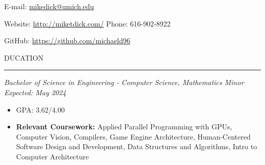 \documentclass[11pt]{article}
\begin{document}
 \hfill E-mail: {\color{black}\url{ mikedick@umich.edu}}
\par Website: \url{http://miketdick.com/} \hfill Phone: 616-902-8922
\par GitHub: \url{https://github.com/michaeld96}
\vspace*{0.1cm}
\par \scalebox{1.3}{E}DUCATION                    
\par \vspace{-0.1in} \noindent\rule{7.8in}{0.5pt} 
\textbf{\scalebox{1.2}{University of Michigan - Ann Arbor}}
\par \textit{Bachelor of Science in Engineering - Computer Science, Mathematics Minor} \hfill \textit{Expected: May 2024}
{\small 

\begin{itemize}
    \item GPA: 3.62/4.00
    \item \textbf{Relevant Coursework:} Applied Parallel Programming with GPUs, Computer Vision, Compilers, Game Engine Architecture, 
    Human-Centered Software Design and Development, Data Structures and Algorithms, Intro to Computer Architecture
\end{itemize}
}
\end{document}
